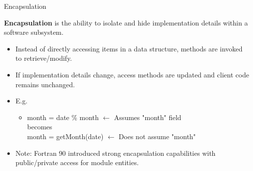 \documentclass[11pt]{beamer}
\begin{document}

\begin{frame}{Encapsulation}

\textbf{Encapsulation} is the ability to isolate and hide implementation details within a software subsystem.
\begin{itemize}

  \item Instead of directly accessing items in a data structure, methods are invoked to retrieve/modify. 
  \item If implementation details change, access methods are updated and client code remains unchanged.
  \item E.g.
  \begin{itemize}
  \item month = date \% month $\leftarrow$  Assumes "month" field\\
  becomes\\
  month = getMonth(date) $\leftarrow$ Does not assume "month"
 \end{itemize}
  \item Note: Fortran 90 introduced strong encapsulation capabilities with public/private access for module entities.

 \end{itemize}

\end{frame}

\end{document}
